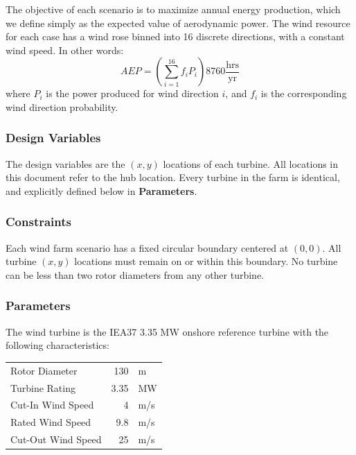 \documentclass{article}
\begin{document}
        The objective of each scenario is to maximize annual energy production, which we define simply as the expected value of aerodynamic power.  The wind resource for each case has a wind rose binned into 16 discrete directions, with a constant wind speed.  In other words:
        \begin{equation*}
            AEP = \left(\sum_{i=1}^{16} f_i P_i\right) 8760 \frac{\textrm{hrs}}{\textrm{yr}}
        \end{equation*}
        where $P_i$ is the power produced for wind direction $i$, and $f_i$ is the corresponding wind direction probability.

    \subsubsection*{Design Variables}

        The design variables are the $(x, y)$ locations of each turbine.
        All locations in this document refer to the hub location.
        Every turbine in the farm is identical, and explicitly defined below in \textbf{Parameters}.

    \subsubsection*{Constraints}

        Each wind farm scenario has a fixed circular boundary centered at $(0, 0)$.  All turbine $(x, y)$ locations must remain on or within this boundary.  No turbine can be less than two rotor diameters from any other turbine.

    \subsubsection*{Parameters}

        The wind turbine is the IEA37 3.35 MW onshore reference turbine \cite{NREL335MW} with the following characteristics:
        \begin{center}
            \begin{tabular}{@{}lrl@{}}
            \toprule
                Rotor Diameter & 130 & m \\ 
                Turbine Rating & 3.35 & MW \\ 
                Cut-In Wind Speed & 4 & m/s \\ 
                Rated Wind Speed & 9.8 & m/s \\ 
                Cut-Out Wind Speed & 25 & m/s \\
            \bottomrule
            \end{tabular}
        \end{center}
\end{document}
